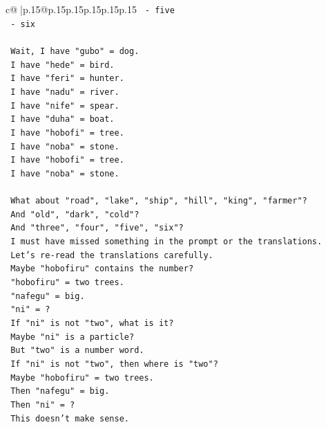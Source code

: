 \documentclass{article}
\begin{document}
{\begin{supertabular}{c@{$\;$}|p{.15\linewidth}@{}p{.15\linewidth}p{.15\linewidth}p{.15\linewidth}p{.15\linewidth}p{.15\linewidth}}
{{{\texttt{        {-} five} \\
\texttt{        {-} six} \\
\\ 
\texttt{        Wait, I have "gubo" = dog.} \\
\texttt{        I have "hede" = bird.} \\
\texttt{        I have "feri" = hunter.} \\
\texttt{        I have "nadu" = river.} \\
\texttt{        I have "nife" = spear.} \\
\texttt{        I have "duha" = boat.} \\
\texttt{        I have "hobofi" = tree.} \\
\texttt{        I have "noba" = stone.} \\
\texttt{        I have "hobofi" = tree.} \\
\texttt{        I have "noba" = stone.} \\
\\ 
\texttt{        What about "road", "lake", "ship", "hill", "king", "farmer"?} \\
\texttt{        And "old", "dark", "cold"?} \\
\texttt{        And "three", "four", "five", "six"?} \\
\texttt{        I must have missed something in the prompt or the translations.} \\
\texttt{        Let's re{-}read the translations carefully.} \\
\texttt{        Maybe "hobofiru" contains the number?} \\
\texttt{        "hobofiru" = two trees.} \\
\texttt{        "nafegu" = big.} \\
\texttt{        "ni" = ?} \\
\texttt{        If "ni" is not "two", what is it?} \\
\texttt{        Maybe "ni" is a particle?} \\
\texttt{        But "two" is a number word.} \\
\texttt{        If "ni" is not "two", then where is "two"?} \\
\texttt{        Maybe "hobofiru" = two trees.} \\
\texttt{        Then "nafegu" = big.} \\
\texttt{        Then "ni" = ?} \\
\texttt{        This doesn't make sense.} \\
}}}
\end{supertabular}}
\end{document}
